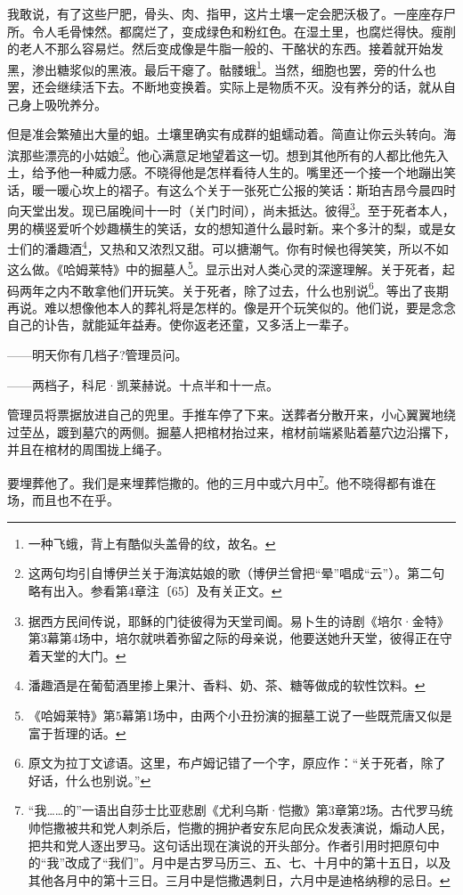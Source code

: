 \par 我敢说，有了这些尸肥，骨头、肉、指甲，这片土壤一定会肥沃极了。一座座存尸所。令人毛骨悚然。都腐烂了，变成绿色和粉红色。在湿土里，也腐烂得快。瘦削的老人不那么容易烂。然后变成像是牛脂一般的、干酪状的东西。接着就开始发黑，渗出糖浆似的黑液。最后干瘪了。骷髅蛾\footnote{一种飞蛾，背上有酷似头盖骨的纹，故名。}。当然，细胞也罢，旁的什么也罢，还会继续活下去。不断地变换着。实际上是物质不灭。没有养分的话，就从自己身上吸吮养分。
\par 但是准会繁殖出大量的蛆。土壤里确实有成群的蛆蠕动着。简直让你云头转向。海滨那些漂亮的小姑娘\footnote{这两句均引自博伊兰关于海滨姑娘的歌（博伊兰曾把“晕”唱成“云”）。第二句略有出入。参看第4章注〔65〕及有关正文。}。他心满意足地望着这一切。想到其他所有的人都比他先入土，给予他一种威力感。不晓得他是怎样看待人生的。嘴里还一个接一个地蹦出笑话，暖一暖心坎上的褶子。有这么个关于一张死亡公报的笑话：斯珀吉昂今晨四时向天堂出发。现已届晚间十一时（关门时间），尚未抵达。彼得\footnote{据西方民间传说，耶稣的门徒彼得为天堂司阍。易卜生的诗剧《培尔·金特》第3幕第4场中，培尔就哄着弥留之际的母亲说，他要送她升天堂，彼得正在守着天堂的大门。}。至于死者本人，男的横竖爱听个妙趣横生的笑话，女的想知道什么最时新。来个多汁的梨，或是女士们的潘趣酒\footnote{潘趣酒是在葡萄酒里掺上果汁、香料、奶、茶、糖等做成的软性饮料。}，又热和又浓烈又甜。可以搪潮气。你有时候也得笑笑，所以不如这么做。《哈姆莱特》中的掘墓人\footnote{《哈姆莱特》第5幕第1场中，由两个小丑扮演的掘墓工说了一些既荒唐又似是富于哲理的话。}。显示出对人类心灵的深邃理解。关于死者，起码两年之内不敢拿他们开玩笑。关于死者，除了过去，什么也别说\footnote{原文为拉丁文谚语。这里，布卢姆记错了一个字，原应作：“关于死者，除了好话，什么也别说。”}。等出了丧期再说。难以想像他本人的葬礼将是怎样的。像是开个玩笑似的。他们说，要是念念自己的讣告，就能延年益寿。使你返老还童，又多活上一辈子。
\par ——明天你有几档子?管理员问。
\par ——两档子，科尼·凯莱赫说。十点半和十一点。
\par 管理员将票据放进自己的兜里。手推车停了下来。送葬者分散开来，小心翼翼地绕过茔丛，踱到墓穴的两侧。掘墓人把棺材抬过来，棺材前端紧贴着墓穴边沿撂下，并且在棺材的周围拢上绳子。
\par 要埋葬他了。我们是来埋葬恺撒的。他的三月中或六月中\footnote{“我……的”一语出自莎士比亚悲剧《尤利乌斯·恺撒》第3章第2场。古代罗马统帅恺撒被共和党人刺杀后，恺撒的拥护者安东尼向民众发表演说，煽动人民，把共和党人逐出罗马。这句话出现在演说的开头部分。作者引用时把原句中的“我”改成了“我们”。月中是古罗马历三、五、七、十月中的第十五日，以及其他各月中的第十三日。三月中是恺撒遇刺日，六月中是迪格纳穆的忌日。}。他不晓得都有谁在场，而且也不在乎。
